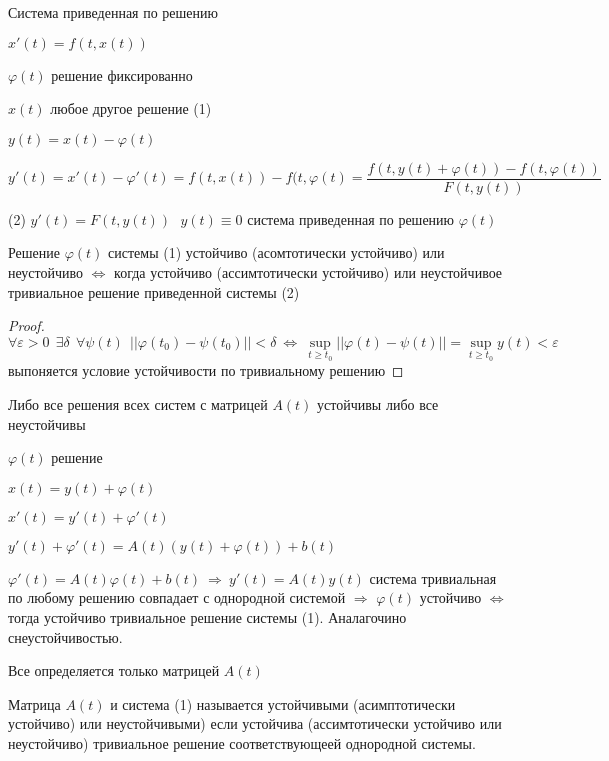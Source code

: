 \begin{title}[\Large]
  Система приведенная по решению
\end{title}

$x'(t) = f(t, x(t))$

$\varphi(t)$ решение фиксированно

$x(t)$ любое другое решение (1)

$y(t) = x(t) - \varphi(t)$

$$
y'(t) = x'(t) - \varphi'(t) = f(t, x(t)) - f(t, \varphi(t) = \frac{f(t, y(t) +
\varphi(t)) - f(t, \varphi(t))}{F(t, y(t))}
$$

(2) $y'(t) = F(t, y(t)) ~~~ y(t) \equiv 0$ система приведенная по решению
$\varphi(t)$

\begin{block}[Утверждение]
  Решение $\varphi(t)$ системы (1) устойчиво (асомтотически устойчиво) или
  неустойчиво $\Leftrightarrow$ когда устойчиво (ассимтотически устойчиво) или
  неустойчивое тривиальное решение приведенной системы (2)
\end{block}

\begin{proof}
  $$
  \forall \varepsilon > 0 ~~ \exists \delta ~~ \forall \psi(t) ~~
  ||\varphi(t_0) - \psi(t_0)|| < \delta ~ \Leftrightarrow ~ \sup_{t \ge t_0}
  ||\varphi(t) - \psi(t)|| = \sup_{t \ge t_0} y(t) < \varepsilon
  $$
  выпоняется условие устойчивости по тривиальному решению
\end{proof}

\begin{block}[Утверждение]
  Либо все решения всех систем с матрицей $A(t)$ устойчивы либо все неустойчивы

  $\varphi(t)$ решение

  $x(t) = y(t) + \varphi(t)$

  $x'(t) = y'(t) + \varphi'(t)$

  $y'(t) + \varphi'(t) = A(t)(y(t) + \varphi(t)) + b(t)$

  $\varphi'(t) = A(t)\varphi(t) + b(t) ~ \Rightarrow ~ y'(t) = A(t)y(t)$
  система тривиальная по любому решению совпадает с однородной системой
  $\Rightarrow$ $\varphi(t)$ устойчиво $\Leftrightarrow$ тогда устойчиво
  тривиальное решение системы (1). Аналагочино снеустойчивостью.

  Все определяется только матрицей $A(t)$
\end{block}

\begin{define}
  Матрица $A(t)$ и система (1) называется устойчивыми (асимптотически устойчиво)
  или неустойчивыми) если устойчива (ассимтотически устойчиво или неустойчиво)
  тривиальное решение соответствующеей однородной системы.
\end{define}


